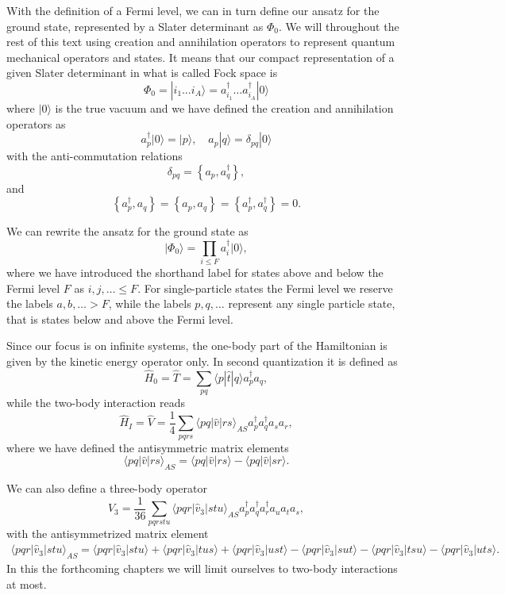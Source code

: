 With the definition of  a Fermi level, we can in turn define our ansatz for the ground state, represented by a Slater determinant
as $\Phi_0$.  We will throughout the rest of this text using creation and annihilation operators to represent quantum mechanical operators and states.
It means that our compact representation of a given Slater determinant in what is called Fock space \cite{deffockspace} is
\[
  \Phi_{0}=|i_1 \dots i_A\rangle= a_{i_1}^{\dagger} \dots a_{i_A}^{\dagger} |0\rangle
\]
where $\vert 0\rangle$ is the true vacuum and we have defined the creation and annihilation operators as
    \[
        a_p^\dagger|0\rangle = |p\rangle, \quad a_p |q\rangle = \delta_{pq}|0\rangle
    \]
with the anti-commutation relations
\[
  \delta_{pq} = \left\{a_p, a_q^\dagger \right\},
\]
and 
\[
\left\{a_p^\dagger, a_q \right\} = \left\{a_p, a_q \right\} = \left\{a_p^\dagger, a_q^\dagger \right\}=0.
\]

We can rewrite the ansatz for the ground state as
\[
\vert\Phi_0\rangle = \prod_{i\le F}a_{i}^{\dagger} |0\rangle,
\]
where we have introduced the shorthand label for states above and below the Fermi level $F$ as
$i,j,\ldots \leq F$. For single-particle states the Fermi level we reserve the labels $a,b,\ldots > F$, while the labels $p,q, \ldots$
represent any single particle state, that is states below and above the Fermi level. 

Since our focus is on infinite systems, the one-body part of the Hamiltonian is given by the kinetic energy operator only.
In second quantization it is defined as
\[
\hat{H}_0=\hat{T} = \sum_{pq} \langle p|\hat{t}|q\rangle a_p^\dagger a_q,
\]
while the two-body interaction  reads
\[
\hat{H}_I=\hat{V} = \frac{1}{4} \sum_{pqrs} \langle pq|\hat{v}|rs\rangle_{AS} a_p^\dagger a_q^\dagger a_s a_r,
\]
where we have defined the antisymmetric matrix elements
\[
\langle pq|\hat{v}|rs\rangle_{AS} = \langle pq|\hat{v}|rs\rangle - \langle pq|\hat{v}|sr\rangle.
\]

We can also define a three-body operator
\[
\hat{V}_3 = \frac{1}{36} \sum_{pqrstu} \langle pqr|\hat{v}_3|stu\rangle_{AS} 
                a_p^\dagger a_q^\dagger a_r^\dagger a_u a_t a_s,
\]
with the antisymmetrized matrix element
\begin{align}
            \langle pqr|\hat{v}_3|stu\rangle_{AS} = \langle pqr|\hat{v}_3|stu\rangle + \langle pqr|\hat{v}_3|tus\rangle + \langle pqr|\hat{v}_3|ust\rangle- \langle pqr|\hat{v}_3|sut\rangle - \langle pqr|\hat{v}_3|tsu\rangle - \langle pqr|\hat{v}_3|uts\rangle.
\end{align}
In this the forthcoming chapters we will limit ourselves to two-body interactions at most. 

